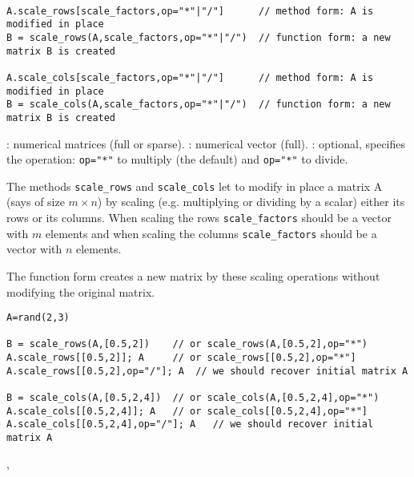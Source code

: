 \begin{mandesc}
  \\ 
\end{mandesc}
\begin{calling_sequence}
\begin{verbatim}
A.scale_rows[scale_factors,op="*"|"/"]      // method form: A is modified in place
B = scale_rows(A,scale_factors,op="*"|"/")  // function form: a new matrix B is created

A.scale_cols[scale_factors,op="*"|"/"]      // method form: A is modified in place
B = scale_cols(A,scale_factors,op="*"|"/")  // function form: a new matrix B is created
\end{verbatim}
\end{calling_sequence}
\begin{parameters}
  \begin{varlist}
    : numerical matrices (full or sparse).
    : numerical vector (full).
    : optional, specifies the operation: \verb+op="*"+ to multiply (the default)
                   and  \verb+op="*"+ to divide.
  \end{varlist}
\end{parameters}

\begin{mandescription}

The methods \verb+scale_rows+ and \verb+scale_cols+ let to modify in place a matrix A 
(says of size $m \times n$) by scaling (e.g. multiplying or dividing by a scalar) either its rows 
or its columns. When scaling the rows  \verb+scale_factors+ should be a vector with $m$ 
elements and when scaling the columns \verb+scale_factors+ should be a vector with 
$n$ elements.

The function form  creates a new matrix by these scaling operations without modifying 
the original matrix.
\end{mandescription}


\begin{examples}
\begin{Verbatim}
A=rand(2,3)

B = scale_rows(A,[0.5,2])    // or scale_rows(A,[0.5,2],op="*") 
A.scale_rows[[0.5,2]]; A     // or scale_rows[[0.5,2],op="*"] 
A.scale_rows[[0.5,2],op="/"]; A  // we should recover initial matrix A

B = scale_cols(A,[0.5,2,4])  // or scale_cols(A,[0.5,2,4],op="*") 
A.scale_cols[[0.5,2,4]]; A   // or scale_cols[[0.5,2,4],op="*"] 
A.scale_cols[[0.5,2,4],op="/"]; A   // we should recover initial matrix A
\end{Verbatim}

\end{examples}

\begin{manseealso}
,
\end{manseealso}


